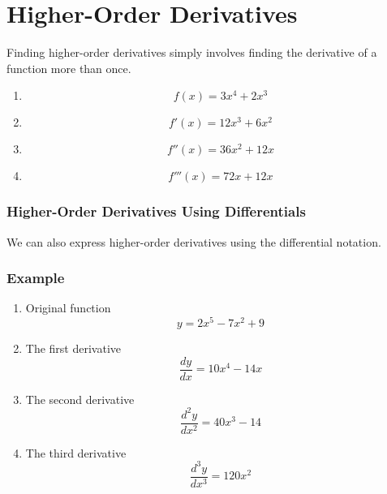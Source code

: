 \documentclass[a4paper,11pt]{book}
\begin{document}
\section{Higher-Order Derivatives}
Finding higher-order derivatives simply involves finding the derivative of a function more than once.

\begin{enumerate}
\LARGE
  \item \[ f(x) = 3x^4 + 2x^3 \]
  \item \[ f'(x) = 12x^3 + 6x^2 \]
  \item \[ f''(x) = 36x^2 + 12x \]
  \item \[ f'''(x) = 72x  + 12x \]
\end{enumerate}

\subsubsection{Higher-Order Derivatives Using Differentials}
We can also express higher-order derivatives using the differential notation.

\subsubsection{Example}

\LARGE
\begin{enumerate}
\item \normalsize Original function \LARGE \[ y = 2x^5 - 7x^2 + 9 \] 
\item \normalsize The first derivative \LARGE \[ \frac{dy}{dx} = 10x^4 - 14x \]
\item \normalsize The second derivative \LARGE \[ \frac{d^2y}{dx^2} = 40x^3 - 14 \]
\item \normalsize The third derivative \LARGE \[ \frac{d^3y}{dx^3} = 120x^2 \]
\end{enumerate}
\end{document}
